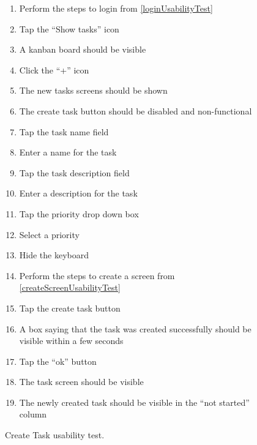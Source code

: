 \begin{figure}[H]
    \begin{enumerate}
        \item Perform the steps to login from \autoref{loginUsabilityTest}

        \item Tap the “Show tasks” icon
        \item A kanban board should be visible
        \item Click the “+” icon
        \item The new tasks screens should be shown
        \item The create task button should be disabled and non-functional 
        \item Tap the task name field
        \item Enter a name for the task
        \item Tap the task description field
        \item Enter a description for the task
        \item Tap the priority drop down box
        \item Select a priority
        \item Hide the keyboard
        \item Perform the steps to create a screen from \autoref{createScreenUsabilityTest}
        \item Tap the create task button
        \item A box saying that the task was created successfully should be visible within a few seconds
        \item Tap the “ok” button
        \item The task screen should be visible
        \item The newly created task should be visible in the “not started” column
    \end{enumerate}
    \caption{Create Task usability test.}
    \label{createTaskUsabilityTest}
\end{figure}



